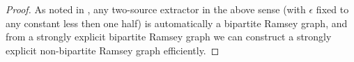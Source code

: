 \begin{proof}
As noted in \cite{BRSW}, any two-source extractor in the above sense (with $\epsilon$ fixed to any constant less then one half) is automatically a bipartite Ramsey graph, and from a strongly explicit bipartite Ramsey graph we can construct a strongly explicit non-bipartite Ramsey graph efficiently.
\end{proof}






